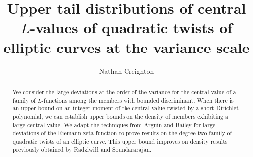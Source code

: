 \documentclass[12pt]{amsart}
\numberwithin{equation}{section}
\numberwithin{thm}{section}
\newcommand{\1}{\mathbf 1}
\begin{document}
	\title[Upper tail distributions  of central $L$-values of elliptic curves]{Upper tail distributions  of central $L$-values of  quadratic twists of elliptic curves at the variance scale}
	\author{Nathan Creighton}
	\address{N. Creighton, Mathematical Institute, University of Oxford, UK}
	\maketitle	
	\begin{abstract}
		We consider the large deviations at the order of the variance for the central value of a family of $L$-functions among the members with bounded discriminant. When there is an upper bound on an integer moment of the central value twisted by a short Dirichlet polynomial,  we can establish upper bounds on the density of members exhibiting a large central value. We adapt the techniques from Arguin and Bailey for large deviations of the Riemann zeta function to prove results on the degree two family of quadratic twists of an elliptic curve. This upper bound improves on density results previously obtained by Radziwi\l{\l} and Soundararajan.
\end{abstract}
\end{document}
